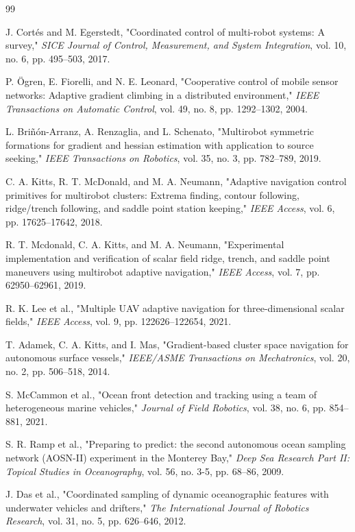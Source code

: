 \documentclass[12pt, letterpaper, oneside]{report}
\begin{document}
\begin{thebibliography}{99}

 J. Cortés and M. Egerstedt, "Coordinated control of multi-robot systems: A survey," \textit{SICE Journal of Control, Measurement, and System Integration}, vol. 10, no. 6, pp. 495--503, 2017.

 P. Ögren, E. Fiorelli, and N. E. Leonard, "Cooperative control of mobile sensor networks: Adaptive gradient climbing in a distributed environment," \textit{IEEE Transactions on Automatic Control}, vol. 49, no. 8, pp. 1292--1302, 2004.

 L. Briñón-Arranz, A. Renzaglia, and L. Schenato, "Multirobot symmetric formations for gradient and hessian estimation with application to source seeking," \textit{IEEE Transactions on Robotics}, vol. 35, no. 3, pp. 782--789, 2019.

 C. A. Kitts, R. T. McDonald, and M. A. Neumann, "Adaptive navigation control primitives for multirobot clusters: Extrema finding, contour following, ridge/trench following, and saddle point station keeping," \textit{IEEE Access}, vol. 6, pp. 17625--17642, 2018.

 R. T. Mcdonald, C. A. Kitts, and M. A. Neumann, "Experimental implementation and verification of scalar field ridge, trench, and saddle point maneuvers using multirobot adaptive navigation," \textit{IEEE Access}, vol. 7, pp. 62950--62961, 2019.

 R. K. Lee et al., "Multiple UAV adaptive navigation for three-dimensional scalar fields," \textit{IEEE Access}, vol. 9, pp. 122626--122654, 2021.

 T. Adamek, C. A. Kitts, and I. Mas, "Gradient-based cluster space navigation for autonomous surface vessels," \textit{IEEE/ASME Transactions on Mechatronics}, vol. 20, no. 2, pp. 506--518, 2014.

 S. McCammon et al., "Ocean front detection and tracking using a team of heterogeneous marine vehicles," \textit{Journal of Field Robotics}, vol. 38, no. 6, pp. 854--881, 2021.

 S. R. Ramp et al., "Preparing to predict: the second autonomous ocean sampling network (AOSN-II) experiment in the Monterey Bay," \textit{Deep Sea Research Part II: Topical Studies in Oceanography}, vol. 56, no. 3-5, pp. 68--86, 2009.

 J. Das et al., "Coordinated sampling of dynamic oceanographic features with underwater vehicles and drifters," \textit{The International Journal of Robotics Research}, vol. 31, no. 5, pp. 626--646, 2012.


\end{thebibliography}
\end{document}
